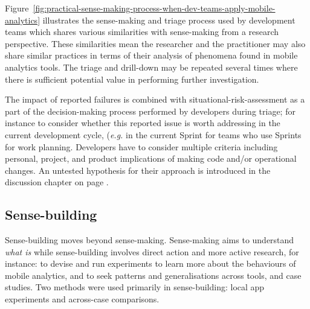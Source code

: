 Figure~\ref{fig:practical-sense-making-process-when-dev-teams-apply-mobile-analytics} illustrates the sense-making and triage process used by development teams which shares various similarities with sense-making from a research perspective. These similarities mean the researcher and the practitioner may also share similar practices in terms of their analysis of phenomena found in mobile analytics tools. The triage and drill-down may be repeated several times where there is sufficient potential value in performing further investigation. 

The impact of reported failures is combined with situational-risk-assessment as a part of the decision-making process performed by developers during triage; for instance to consider whether this reported issue is worth addressing in the current development cycle, (\textit{e.g.} in the current Sprint for teams who use Sprints for work planning. Developers have to consider multiple criteria including personal, project, and product implications of making code and/or operational changes. An untested hypothesis for their approach is introduced in the discussion chapter on page \pageref{discussion-decision-making-by-dev-teams-section}.

% 


\subsection{Sense-building}

Sense-building moves beyond sense-making. Sense-making aims to understand \textit{what is} while sense-building involves direct action and more active research, for instance: to devise and run experiments to learn more about the behaviours of mobile analytics, and to seek patterns and generalisations across tools, and case studies. Two methods were used primarily in sense-building: local app experiments and across-case comparisons. 

